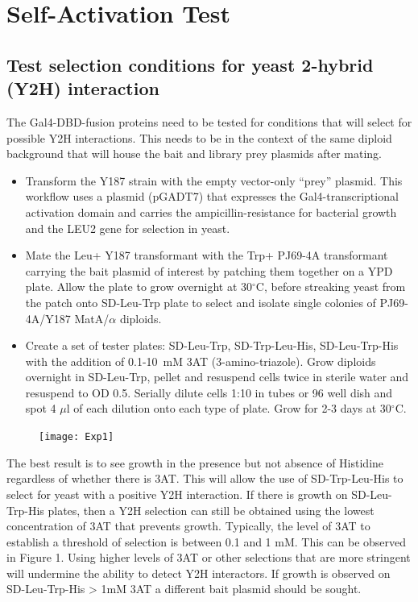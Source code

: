 \documentclass[11pt,fleqn]{book} %
\begin{document}
\section{Self-Activation Test}

\subsection{Test selection conditions for yeast 2-hybrid (Y2H) interaction}

The Gal4-DBD-fusion proteins need to be tested for conditions that will select for possible Y2H interactions. This needs to be in the context of the same diploid background that will house the bait and library prey plasmids after mating. 

\begin{itemize}
    \item Transform the Y187 strain with the empty vector-only “prey” plasmid.  This workflow uses a plasmid (pGADT7) that expresses the Gal4-transcriptional activation domain and carries the ampicillin-resistance for bacterial growth and the LEU2 gene for selection in yeast.
    \item Mate the Leu+ Y187 transformant with the Trp+ PJ69-4A transformant carrying the bait plasmid of interest by patching them together on a YPD plate. Allow the plate to grow overnight at 30$^\circ$C, before streaking yeast from the patch onto SD-Leu-Trp plate to select and isolate single colonies of PJ69-4A/Y187 MatA/$\alpha$ diploids. 
    \item Create a set of tester plates: SD-Leu-Trp, SD-Trp-Leu-His, SD-Leu-Trp-His with the addition of 0.1-10~mM 3AT (3-amino-triazole).  Grow diploids overnight in SD-Leu-Trp, pellet and resuspend cells twice in sterile water and resuspend to OD 0.5. Serially dilute cells 1:10 in tubes or 96 well dish and spot 4 $\mu$l of each dilution onto each type of plate. Grow for 2-3 days at 30$^\circ$C.
\end{itemize}

\begin{figure}[!ht]
    \centering
    \texttt{[image: Exp1]}
    \caption{}
    \label{fig:exp_fig1}
\end{figure}


\begin{remark}
    The best result is to see growth in the presence but not absence of Histidine regardless of whether there is 3AT.  This will allow the use of SD-Trp-Leu-His to select for yeast with a positive Y2H interaction.  If there is growth on SD-Leu-Trp-His plates, then a Y2H selection can still be obtained using the lowest concentration of 3AT that prevents growth.  Typically, the level of 3AT to establish a threshold of selection is between 0.1 and 1 mM.  This can be observed in Figure 1. Using higher levels of 3AT or other selections that are more stringent will undermine the ability to detect Y2H interactors.  If growth is observed on SD-Leu-Trp-His > 1mM 3AT a different bait plasmid should be sought.
\end{remark}
\end{document}
